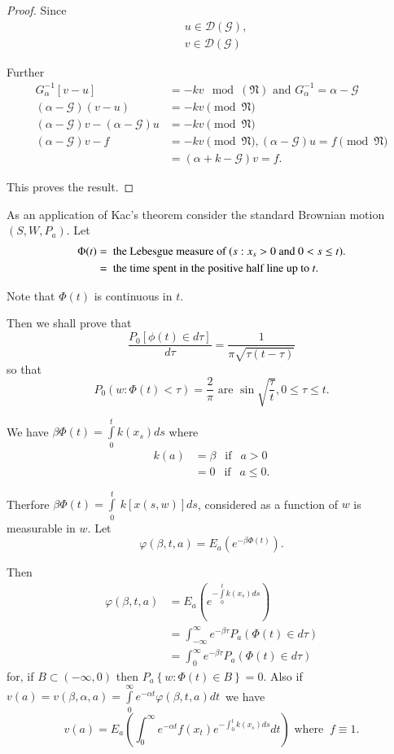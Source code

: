 \begin{proof}
Since
\begin{align*}
 & u \in \mathscr{D} (\mathscr{G}) ,  \\
 & v \in \mathscr{D} (\mathscr{G})
\end{align*}

Further\pageoriginale 
\begin{align*}
G^{-1}_\alpha [ v - u] & = - kv \mod (\mathfrak {N}) \text{ and
    } G^{ -1} _ \alpha = \alpha - \mathscr{G} \\ 
     (\alpha - \mathscr{G}) (v - u) & = - kv \pmod {\mathfrak{N}}\\
     (\alpha - \mathscr{G}) v-(\alpha - \mathscr{G}) u & = - kv \pmod
    {\mathfrak{N}} \\ 
    (\alpha - \mathscr{G}) v -f & = - kv \pmod {\mathfrak{N}}, (\alpha
    - \mathscr{G}) u = f \pmod{\mathfrak{N}}\\ 
     & = (\alpha + k - \mathscr{G}) v =f. 
  \end{align*}

This proves the result.
\end{proof}  

As an application of Kac's theorem consider the standard Brownian
motion $(S, W, P_a)$. Let  
\begin{align*}
\Phi (t) & = \text{ the Lebesgue measure of ($s :x_s > 0$ and $ 0 <
    s\leq t$)}.\\  
  & = \text{ the time spent in the positive half line up to $t$}. 
\end{align*} 

Note that $\Phi (t)$ is continuous in $t$. 

Then  we shall prove that 
$$
\frac{P_0 [\phi (t) \in d \tau ]}{d \tau } = \frac{1}{\pi
     \sqrt{\tau (t-\tau)}}
$$
so that
$$  
P_0 (w: \Phi (t) < \tau ) = \frac{2}{\pi} \text { are } \sin
   \sqrt{\frac{\tau}{t}} , 0 \leq \tau \leq t.
$$

We have $\beta \Phi (t) = \int\limits^t_0 k (x_s)ds$ where 
\begin{align*}
  k(a) &= \beta~~ \text{ if }~~ a > 0 \\
  &= 0 ~~\text{ if }~~ a \leq 0.
\end{align*}\pageoriginale

Therfore $\beta \Phi (t) = \int \limits^{t}_{0} ~ k  [ x (s,w)  ] ds$,
considered as a function of $w$ is measurable in $w$. Let 
$$
  \varphi ( \beta, t, a ) = E_a \left( e^{-\beta \Phi (t)}\right).
$$

Then 
\begin{align*}
\varphi ( \beta,t,a ) &= E_a \left(e^{-\int\limits_0^t k(x_s)ds}\right)\\ 
  &= \int^{\infty}_{-\infty} e^{-\beta \tau} P_a ( \Phi (t) \in d \tau ) \\
  &=\int^{\infty}_{0} e^{-\beta \tau} P_a ( \Phi (t) \in d \tau ) 
\end{align*}
for, if $B \subset (-\infty, 0)$ then $P_a \left\{ w : \Phi (t) \in B
\right \} = 0 $. Also if  $v (a) = v ( \beta, \alpha, a) =  \int
\limits^{\infty}_{0} e^{-\alpha t} \varphi ( \beta, t,a ) dt$\ 
we have 
$$
v (a) = E_a \left( \int^{\infty}_{0} e^{- \alpha t} f(x_t )e
^{-\int^{t}_{0} k (x_s)ds} dt\right) \text{ where } ~ f \equiv 1. 
$$

